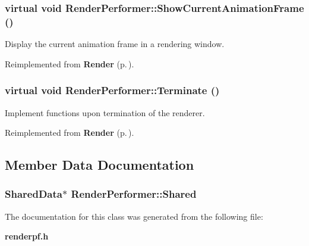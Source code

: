 \subsubsection{\setlength{\rightskip}{0pt plus 5cm}virtual void Render\-Performer::Show\-Current\-Animation\-Frame ()\hspace{0.3cm}{\tt  [protected, virtual]}}\label{class_RenderPerformer_b0}


Display the current animation frame in a rendering window.



Reimplemented from {\bf Render} {\rm (p.\,\pageref{class_Render_b1})}.
\subsubsection{\setlength{\rightskip}{0pt plus 5cm}virtual void Render\-Performer::Terminate ()\hspace{0.3cm}{\tt  [virtual]}}\label{class_RenderPerformer_a6}


Implement functions upon termination of the renderer.



Reimplemented from {\bf Render} {\rm (p.\,\pageref{class_Render_a8})}.

\subsection{Member Data Documentation}
\subsubsection{\setlength{\rightskip}{0pt plus 5cm}Shared\-Data$\ast$ Render\-Performer::Shared\hspace{0.3cm}{\tt  [static, protected]}}\label{class_RenderPerformer_q0}




The documentation for this class was generated from the following file:\begin{CompactItemize}
\item 
{\bf renderpf.h}\end{CompactItemize}
